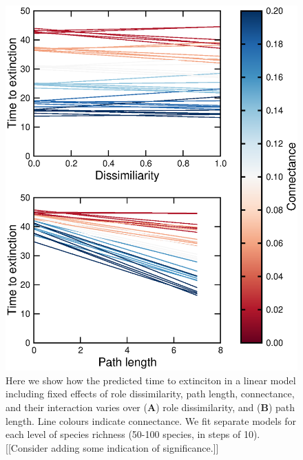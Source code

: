 \documentclass[12pt]{article}
\begin{document}
	\begin{figure}[h!]
		\caption{Here we show how the predicted time to extinciton in a linear model including fixed effects of role dissimilarity, path length, connectance, and their interaction varies over (\textbf{A}) role dissimilarity, and (\textbf{B}) path length. Line colours indicate connectance. We fit separate models for each level of species richness (50-100 species, in steps of 10). [[Consider adding some indication of significance.]]}
		\label{lmerfig}
		\includegraphics[height=.75\textheight]{figures/extinction_order/dissimilarity_fits_summary_paper_full.eps}
		\end{figure}
\end{document}
